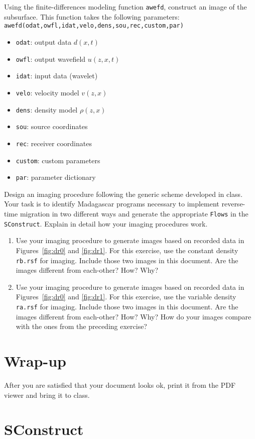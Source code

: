 Using the finite-differences modeling function \texttt{awefd},
construct an image of the subsurface. This function takes the
following parameters: \\
\texttt{awefd(odat,owfl,idat,velo,dens,sou,rec,custom,par)}
\begin{itemize}
\item \texttt{odat}: output data $d\left( x,t \right)$
\item \texttt{owfl}: output wavefield $u \left( z,x,t \right)$
\item \texttt{idat}: input data (wavelet)
\item \texttt{velo}: velocity model $v \left( z,x \right)$
\item \texttt{dens}: density model $\rho \left( z,x \right)$
\item \texttt{sou}: source coordinates
\item \texttt{rec}: receiver coordinates
\item \texttt{custom}: custom parameters
\item\texttt{par}: parameter dictionary
\end{itemize}

Design an imaging procedure following the generic scheme developed in
class. Your task is to identify Madagascar programs necessary to
implement reverse-time migration in two different ways and generate
the appropriate \texttt{Flows} in the \texttt{SConstruct}. Explain in
detail how your imaging procedures work. 

\begin{enumerate}
\item Use your imaging procedure to generate images based on recorded
  data in Figures~\ref{fig:dr0} and \ref{fig:dr1}. For this exercise,
  use the constant density \texttt{rb.rsf} for imaging. Include those
  two images in this document. Are the images different from
  each-other? How? Why?

\item Use your imaging procedure to generate images based on recorded
  data in Figures~\ref{fig:dr0} and \ref{fig:dr1}. For this exercise,
  use the variable density \texttt{ra.rsf} for imaging. Include those
  two images in this document. Are the images different from
  each-other? How? Why? How do your images compare with the ones from
  the preceding exercise?
\end{enumerate}

\section{Wrap-up}

After you are satisfied that your document looks ok, print it from the
PDF viewer and bring it to class.

\newpage
\section{SConstruct}
\tiny

\normalsize


